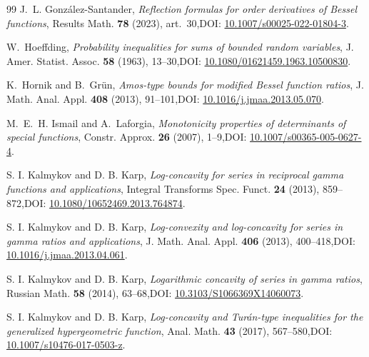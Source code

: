 \documentclass[11pt,a4paper]{amsart}
\numberwithin{equation}{section}
\theoremstyle{plain}
\theoremstyle{definition}
\begin{document}
\begin{thebibliography}{99}
J.~L. Gonz\'alez-Santander,
\emph{Reflection formulas for order derivatives of Bessel functions},
Results Math. \textbf{78} (2023), art.~30,\newline DOI: \href{https://doi.org/10.1007/s00025-022-01804-3}{10.1007/s00025-022-01804-3}.


W.~Hoeffding,
\emph{Probability inequalities for sums of bounded random variables},
J. Amer. Statist. Assoc. \textbf{58} (1963), 13--30,\newline DOI: \href{https://doi.org/10.1080/01621459.1963.10500830}{10.1080/01621459.1963.10500830}.

K.~Hornik and B.~Gr\"un,
\emph{Amos-type bounds for modified Bessel function ratios},
J. Math. Anal. Appl. \textbf{408} (2013), 91--101,\newline DOI: \href{https://doi.org/10.1016/j.jmaa.2013.05.070}{10.1016/j.jmaa.2013.05.070}.

M.~E.~H. Ismail and A.~Laforgia,
\emph{Monotonicity properties of determinants of special functions},
Constr. Approx. \textbf{26} (2007), 1--9,\newline DOI: \href{https://doi.org/10.1007/s00365-005-0627-4}{10.1007/s00365-005-0627-4}.

S. I. Kalmykov and D. B. Karp,
\emph{Log-concavity for series in reciprocal gamma functions and applications},
Integral Transforms Spec. Funct. \textbf{24} (2013), 859--872,\newline DOI: \href{https://doi.org/10.1080/10652469.2013.764874}{10.1080/10652469.2013.764874}.

S. I. Kalmykov and D. B. Karp,
\emph{Log-convexity and log-concavity for series in gamma ratios and applications},
J. Math. Anal. Appl. \textbf{406} (2013), 400--418,\newline DOI: \href{https://doi.org/10.1016/j.jmaa.2013.04.061}{10.1016/j.jmaa.2013.04.061}.

S. I. Kalmykov and D. B. Karp,
\emph{Logarithmic concavity of series in gamma ratios},
Russian Math. \textbf{58} (2014), 63--68,\newline DOI: \href{https://doi.org/10.3103/S1066369X14060073}{10.3103/S1066369X14060073}.

S. I. Kalmykov and D. B. Karp,
\emph{Log-concavity and Tur\'{a}n-type inequalities for the generalized hypergeometric function},
Anal. Math. \textbf{43} (2017), 567--580,\newline DOI: \href{https://doi.org/10.1007/s10476-017-0503-z}{10.1007/s10476-017-0503-z}.


\end{thebibliography}
\end{document}
